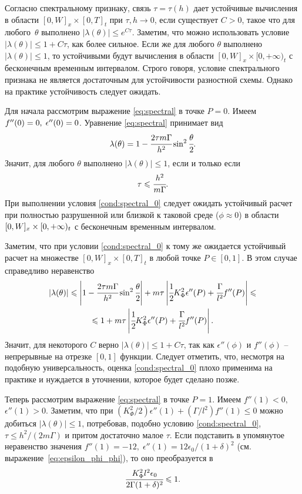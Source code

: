 Согласно спектральному признаку, связь $\tau = \tau(h)$ дает устойчивые вычисления в области $[0, W]_x \times [0, T]_t$ при $\tau, h \to 0$, если существует $C > 0$, такое что для любого~$\theta$ выполнено $|\lambda(\theta)| \leqslant e^{C\tau}$. Заметим, что можно использовать условие $|\lambda(\theta)| \leqslant 1 + C\tau$, как более сильное. Если же для любого $\theta$ выполнено $|\lambda(\theta)| \leqslant 1$, то устойчивыми будут вычисления в области $[0, W]_x \times [0, +\infty)_t$ с бесконечным временным интервалом. Строго говоря, условие спектрального признака не является достаточным для устойчивости разностной схемы. Однако на практике устойчивость следует ожидать.

Для начала рассмотрим выражение \eqref{eq:spectral} в точке $P = 0$. Имеем $f''(0) \hm = 0, \; \epsilon''(0) = 0$. Уравнение \eqref{eq:spectral} принимает вид
$$\lambda(\theta) = 1 - \cfrac{2 \tau m \Gamma}{h^2} \sin^2 \cfrac{\theta}{2} {\text{.}}$$
Значит, для любого $\theta$ выполнено $|\lambda(\theta)| \leqslant 1$, если и только если
\begin{equation}
     \tau \leqslant \cfrac{h^2}{m \Gamma} {\text{.}}
     \label{cond:spectral_0}
\end{equation}
При выполнении условия \eqref{cond:spectral_0} следует ожидать устойчивый расчет при полностью разрушенной или близкой к таковой среде ($\phi \approx 0$) в области $[0, W]_x \hm \times [0, +\infty)_t$ с бесконечным временным интервалом.

Заметим, что при условии \eqref{cond:spectral_0} к тому же ожидается устойчивый расчет на множестве $[0, W]_x \times [0, T]_t$ в любой точке $P \in [0, 1]$. В этом случае справедливо неравенство
\begin{multline*}
    |\lambda(\theta)| \leqslant \left| 1 - \cfrac{2 \tau m \Gamma}{h^2} \sin^2 \cfrac{\theta}{2} \right| + m \tau \left| \cfrac{1}{2} K_\Phi^2 \epsilon''(P) + \cfrac{\Gamma}{l^2} f''(P) \right| \leqslant \\ \leqslant 1 + m \tau \left| \cfrac{1}{2} K_\Phi^2 \epsilon''(P) + \cfrac{\Gamma}{l^2} f''(P) \right| {\text{.}}
\end{multline*}
Значит, для некоторого $C$ верно $|\lambda(\theta)| \leqslant 1 + C \tau$, так как $\epsilon''(\phi)$ и $f''(\phi)$ -- непрерывные на отрезке $[0, 1]$ функции. Следует отметить, что, несмотря на подобную универсальность, оценка \eqref{cond:spectral_0} плохо применима на практике и нуждается в уточнении, которое будет сделано позже.

Теперь рассмотрим выражение \eqref{eq:spectral} в точке $P = 1$. Имеем $f''(1) < 0,$ $\epsilon''(1) > 0$. Заметим, что при $(K_\Phi^2 / 2) \epsilon''(1) + (\Gamma / l^2) f''(1) \leqslant 0$ можно добиться $|\lambda(\theta)| \leqslant 1$, потребовав, подобно условию \eqref{cond:spectral_0}, $\tau \leqslant h^2 / (2m \Gamma)$ и притом достаточно малое $\tau$. Если подставить в упомянутое неравенство значения $f''(1) = -12, \; \epsilon''(1) = 12 \epsilon_0 / (1 + \delta)^2$ (см. выражение~\eqref{eq:epsilon_phi_phi}), то оно преобразуется в
\begin{equation}
    \cfrac{K_\Phi^2 l^2 \epsilon_0}{2 \Gamma (1 + \delta)^2} \leqslant 1 {\text{.}}
    \label{cond:spectral_possible_1}
\end{equation}

